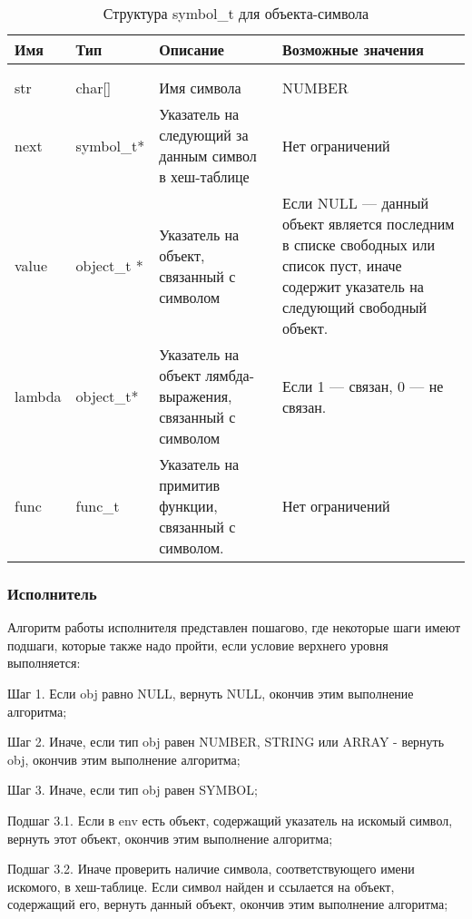 \begin{xltabular}{\textwidth}{|l|l|p{5.7cm}|X|}
	\caption{Структура symbol\_t для объекта-символа\label{strobjsym:table}}\\ \hline
	\centrow Имя & \centrow Тип & \centrow Описание & \centrow Возможные значения \\ \hline
	 &  &  &  \\ \hline
	\endfirsthead
	 &  &  &  \\ \hline
	\finishhead
	str & char[] & Имя символа & NUMBER \\ \hline 
	next & symbol\_t* & Указатель на следующий за данным символ в хеш-таблице & Нет ограничений \\ \hline 
	value & object\_t * & Указатель на объект, связанный с символом & Если NULL — данный объект является последним в списке свободных или список пуст, иначе содержит указатель на следующий свободный объект. \\ \hline 
	lambda & object\_t* & Указатель на объект лямбда-выражения, связанный с символом & Если 1 — связан, 0 — не связан. \\ \hline
	func & func\_t & Указатель на примитив функции, связанный с символом. & Нет ограничений
\end{xltabular}


\subsubsection{Исполнитель}

Алгоритм работы исполнителя представлен пошагово, где некоторые шаги имеют подшаги, которые также надо пройти, если условие верхнего уровня выполняется:

Шаг 1. Если obj равно NULL, вернуть NULL, окончив этим выполнение алгоритма;

Шаг 2. Иначе, если тип obj равен NUMBER, STRING или ARRAY - вернуть obj, окончив этим выполнение алгоритма;

Шаг 3. Иначе, если тип obj равен SYMBOL;

Подшаг 3.1. Если в env есть объект, содержащий указатель на искомый символ, вернуть этот объект, окончив этим выполнение алгоритма;

Подшаг 3.2. Иначе проверить наличие символа, соответствующего имени искомого, в хеш-таблице. Если символ найден и ссылается на объект, содержащий его, вернуть данный объект, окончив этим выполнение алгоритма;


